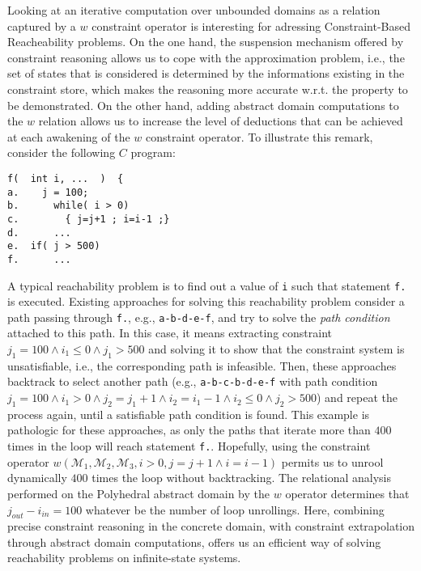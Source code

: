 \documentclass[submission,copyright,creativecommons]{eptcs}
\newcommand{\M}{\mathcal{M}}
\begin{document}
Looking at an iterative computation over unbounded domains as a relation captured by a $w$ constraint operator is 
interesting for adressing Constraint-Based Reacheability problems. On the one hand, the suspension mechanism offered by constraint reasoning allows us 
to cope with the approximation problem, i.e., the set of states that is considered is determined by the informations existing 
in the constraint store, which makes the reasoning more accurate w.r.t. the property to be demonstrated. On the other hand, adding abstract domain 
computations to the $w$ relation allows us to increase the level of deductions that can be achieved at each awakening of the $w$ constraint operator. 
To illustrate this remark, consider the following $C$ program:
\begin{verbatim}
f(  int i, ...  )  {
a.    j = 100;
b.      while( i > 0)
c.        { j=j+1 ; i=i-1 ;}
d.      ... 
e.	if( j > 500)
f.	    ...
\end{verbatim}
\noindent
A typical reachability problem is to find out a value of {\tt i} such that statement {\tt f.} is executed. Existing approaches for solving this reachability problem consider a path passing through {\tt f.}, e.g., {\tt a-b-d-e-f}, and try to solve the {\it path condition} attached to this path. In this case, it means extracting constraint $j_1 = 100 \land i_1 \leq 0 \land j_1 > 500$ and solving it to show that the constraint system is unsatisfiable, i.e., the corresponding path is infeasible. Then, these approaches backtrack to select another path (e.g., {\tt a-b-c-b-d-e-f} with path condition 
$j_1 = 100 \land i_1 > 0 \land j_2 = j_1+1 \land i_2 = i_1-1 \land i_2 \leq 0 \land j_2 > 500$) and repeat the process again, until a satisfiable path condition is found. This example is pathologic for these approaches, as only the paths that iterate more than $400$ times in the loop will reach statement {\tt f.}. Hopefully, using the constraint operator $w(\M_1, \M_2, \M_3, i > 0, j=j+1 \land i=i-1)$ permits us to unrool dynamically $400$ times the loop without backtracking. The relational analysis performed on the Polyhedral abstract domain by the $w$ operator determines that $j_{out} - i_{in} = 100$ whatever be the number of loop unrollings. Here, combining precise constraint reasoning in the concrete domain, with constraint extrapolation through abstract domain computations, offers us an efficient way of solving reachability problems on infinite-state systems.   
\end{document}
